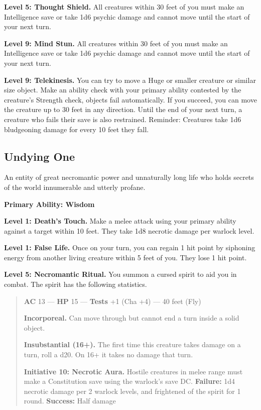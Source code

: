 \documentclass[12pt,letterpaper,twocolumn,openany,nodeprecatedcode,bg=none]{dndbook}
\let\oldsubsection\subsection
\renewcommand{\subsection}[1]{%
  \needspace{5\baselineskip}%
  \oldsubsection{#1}%
}
\begin{document}
\textbf{Level 5: Thought Shield.} All creatures within 30 feet of you
must make an Intelligence save or take 1d6 psychic damage and cannot
move until the start of your next turn.

\textbf{Level 9: Mind Stun.} All creatures within 30 feet of you must
make an Intelligence save or take 1d6 psychic damage and cannot move
until the start of your next turn.

\textbf{Level 9: Telekinesis.} You can try to move a Huge or smaller
creature or similar size object. Make an ability check with your primary
ability contested by the creature's Strength check, objects fail
automatically. If you succeed, you can move the creature up to 30 feet
in any direction. Until the end of your next turn, a creature who fails
their save is also restrained. Reminder: Creatures take 1d6 bludgeoning
damage for every 10 feet they fall.

\clearpage

\subsection{Undying One}\label{undying-one}

An entity of great necromantic power and unnaturally long life who holds
secrets of the world innumerable and utterly profane.

\textbf{Primary Ability: Wisdom}

\textbf{Level 1: Death's Touch.} Make a melee attack using your primary
ability against a target within 10 feet. They take 1d8 necrotic damage
per warlock level.

\textbf{Level 1: False Life.} Once on your turn, you can regain 1 hit
point by siphoning energy from another living creature within 5 feet of
you. They lose 1 hit point.

\textbf{Level 5: Necromantic Ritual.} You summon a cursed spirit to aid
you in combat. The spirit has the following statistics.

\begin{quote}
\textbf{AC} 13 --- \textbf{HP} 15 --- \textbf{Tests} +1 (Cha +4) --- 40
feet (Fly)

\textbf{Incorporeal.} Can move through but cannot end a turn inside a
solid object.

\textbf{Insubstantial (16+).} The first time this creature takes damage
on a turn, roll a d20. On 16+ it takes no damage that turn.

\textbf{Initiative 10: Necrotic Aura.} Hostile creatures in melee range
must make a Constitution save using the warlock's save DC.
\textbf{Failure:} 1d4 necrotic damage per 2 warlock levels, and
frightened of the spirit for 1 round. \textbf{Success:} Half damage
\end{quote}
\end{document}
